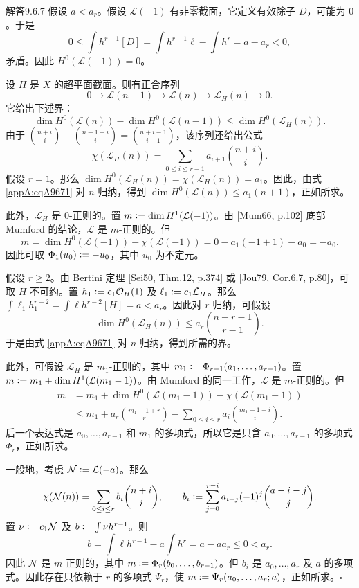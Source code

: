 \begin{origstatement}{解答}{9.6.7}\label{appA:ans967}
假设 $a<a_r$。假设 $\mathcal L(-1)$ 有非零截面，它定义有效除子 $D$，可能为 $0$。于是
\[
 0\leq\int h^{r-1}[D]=\int h^{r-1}\ell-\int h^r=a-a_r<0,
\]
矛盾。因此 $H^0(\mathcal L(-1))=0$。

设 $H$ 是 $X$ 的超平面截面。则有正合序列
\[
 0\longrightarrow\mathcal L(n-1)\longrightarrow\mathcal L(n)\longrightarrow\mathcal L_H(n)\longrightarrow0.
\]
它给出下述界：
\begin{equation}\tag{A.9.6.7.1}\label{appA:eqA9671}
 \dim H^0(\mathcal L(n))-\dim H^0(\mathcal L(n-1))\leq\dim H^0(\mathcal L_H(n)).
\end{equation}
由于 $\binom{n+i}{i}-\binom{n-1+i}{i}=\binom{n+i-1}{i-1}$，该序列还给出公式
\[
 \chi(\mathcal L_H(n))=\sum_{0\leq i\leq r-1}a_{i+1}\binom{n+i}{i}.
\]
假设 $r=1$。那么 $\dim H^0(\mathcal L_H(n))=\chi(\mathcal L_H(n))=a_1$。因此，由式 \eqref{appA:eqA9671} 对 $n$ 归纳，得到 $\dim H^0(\mathcal L(n))\leq a_1(n+1)$，正如所求。

此外，$\mathcal L_H$ 是 $0$-正则的。置 $m\mathrel{\mathop:}=\dim H^1(\mathcal L(-1))$。由 [Mum66, p.102] 底部 Mumford 的结论，$\mathcal L$ 是 $m$-正则的。但
\[
 m=\dim H^0(\mathcal L(-1))-\chi(\mathcal L(-1))=0-a_1(-1+1)-a_0=-a_0.
\]
因此可取 $\Phi_1(u_0)\mathrel{\mathop:}=-u_0$，其中 $u_0$ 为不定元。

假设 $r\geq2$。由 Bertini 定理 [Sei50, Thm.12, p.374] 或 [Jou79, Cor.6.7, p.80]，可取 $H$ 不可约。置 $h_1\mathrel{\mathop:}= c_1\mathcal O_H(1)$ 及 $\ell_1\mathrel{\mathop:}= c_1\mathcal L_H$。那么
$\int\ell_1h_1^{r-2}=\int\ell h^{r-2}[H]=a<a_r$。因此对 $r$ 归纳，可假设
\[
 \dim H^0(\mathcal L_H(n))\leq a_r\binom{n+r-1}{r-1}.
\]
于是由式 \eqref{appA:eqA9671} 对 $n$ 归纳，得到所需的界。

此外，可假设 $\mathcal L_H$ 是 $m_1$-正则的，其中 $m_1\mathrel{\mathop:}=\Phi_{r-1}(a_1,\ldots,a_{r-1})$。置 $m\mathrel{\mathop:}= m_1+\dim H^1(\mathcal L(m_1-1))$。由 Mumford 的同一工作，$\mathcal L$ 是 $m$-正则的。但
\[
\begin{aligned}
 m&=m_1+\dim H^0(\mathcal L(m_1-1))-\chi(\mathcal L(m_1-1))\\
 &\leq m_1+a_r\binom{m_1-1+r}{r}-\sum_{0\leq i\leq r}a_i\binom{m_1-1+i}{i}.
\end{aligned}
\]
后一个表达式是 $a_0,\ldots,a_{r-1}$ 和 $m_1$ 的多项式，所以它是只含 $a_0,\ldots,a_{r-1}$ 的多项式 $\Phi_r$，正如所求。

一般地，考虑 $\mathcal N\mathrel{\mathop:}=\mathcal L(-a)$。那么
\[
 \chi(\mathcal N(n))=\sum_{0\leq i\leq r}b_i\binom{n+i}{i},\qquad
 b_i\mathrel{\mathop:}=\sum_{j=0}^{r-i}a_{i+j}(-1)^j\binom{a-i-j}{j}.
\]
置 $\nu\mathrel{\mathop:}= c_1\mathcal N$ 及 $b\mathrel{\mathop:}=\int\nu h^{r-1}$。则
\[
 b=\int\ell h^{r-1}-a\int h^r=a-aa_r\leq0<a_r.
\]
因此 $\mathcal N$ 是 $m$-正则的，其中 $m\mathrel{\mathop:}=\Phi_r(b_0,\ldots,b_{r-1})$。但 $b_i$ 是 $a_0,\ldots,a_r$ 及 $a$ 的多项式。因此存在只依赖于 $r$ 的多项式 $\Psi_r$，使 $m\mathrel{\mathop:}=\Psi_r(a_0,\ldots,a_r;a)$，正如所求。\hfill$\square$
\end{origstatement}

